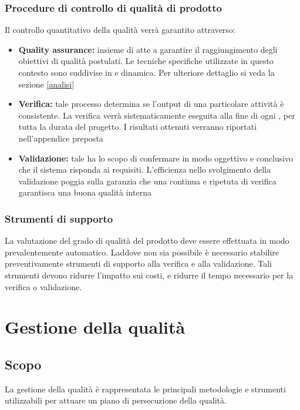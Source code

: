 \documentclass[12pt,a4paper]{article}
\begin{document}
\subsubsection{Procedure di controllo di qualità di prodotto}
\label{sec:procedure-di-controllo-di-qualità-di-prodotto}
Il controllo quantitativo della qualità verrà garantito attraverso:

\begin{itemize}
	\item \textbf{Quality assurance:} insieme di  atte a garantire il raggiungimento degli obiettivi di qualità postulati. Le tecniche specifiche utilizzate in questo contesto sono suddivise in  e dinamica. Per ulteriore dettaglio si veda la sezione \ref{analisi}
	\item \textbf{Verifica:} tale processo determina se l'output di una particolare attività è consistente. La verifica verrà sistematicamente eseguita alla fine di ogni , per tutta la durata del progetto. I risultati ottenuti verranno riportati nell'appendice preposta
	\item \textbf{Validazione:} tale   ha lo scopo di confermare in modo oggettivo e conclusivo che il sistema risponda ai requisiti. L'efficienza nello svolgimento della validazione poggia sulla garanzia che una continua e ripetuta  di verifica garantisca una buona qualità interna
\end{itemize}

\subsubsection{Strumenti di supporto}
La valutazione del grado di qualità del prodotto deve essere effettuata in modo prevalentemente automatico. Laddove non sia possibile è necessario stabilire preventivamente strumenti di supporto alla verifica e alla validazione. Tali strumenti devono ridurre l'impatto sui costi, e ridurre il tempo necessario per la verifica o validazione. 

\section{Gestione della qualità} \label{gest_qual}

\subsection{Scopo}
La gestione della qualità è rappresentata le principali metodologie e strumenti utilizzabili per attuare un piano di persecuzione della qualità. 
\end{document}
